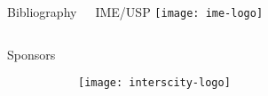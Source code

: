 \begin{frame}[fragile]
  \begin{columns}[T]

  \twothirdscol

  \begin{block}{Bibliography}
    \nocite{FSF:GNU-GPL, MenaChalco08, biblatex}
    \printbibliography
    \vspace*{.18\baselineskip}
  \end{block}

  \onethirdcol

  \begin{block}{IME/USP}
      \centering
      \texttt{[image: ime-logo]}
  \end{block}

\end{columns}

\vspace*{.5\baselineskip}

\begin{columns}[T]

  \onethirdcol

  \begin{block}{Sponsors}
    \centering
    \begin{figure}[H] %
      \begin{subfigure}{.3\textwidth}
        \centering
        \texttt{[image: interscity-logo]}
      \end{subfigure}
      \begin{subfigure}{.3\textwidth}
        \centering
      \end{subfigure}
      \begin{subfigure}{.3\textwidth}
        \centering
      \end{subfigure}
    \end{figure}
  \end{block}

  \onethirdcol


\end{columns}
\end{frame}
